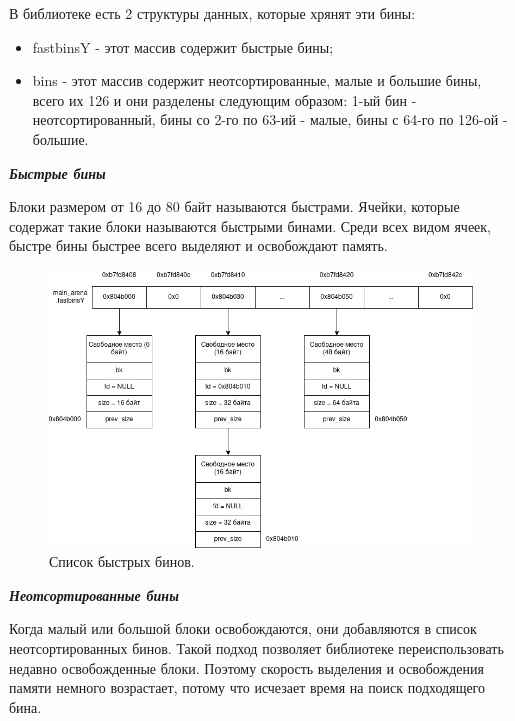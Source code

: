 В библиотеке есть 2 структуры данных, которые хрянят эти бины:
\begin{itemize}
	\item fastbinsY - этот массив содержит быстрые бины;
	\item bins - этот массив содержит неотсортированные, малые и большие бины, всего их 126 и они разделены следующим образом: 1-ый бин - неотсортированный, бины со 2-го по 63-ий - малые, бины с 64-го по 126-ой - большие.
\end{itemize}

\bigbreak
\textit{\textbf{Быстрые бины}}

Блоки размером от 16 до 80 байт называются быстрами. Ячейки, которые содержат такие блоки называются быстрыми бинами. Среди всех видом ячеек, быстре бины быстрее всего выделяют и освобождают память.

\begin{figure}[!h]
	\begin{center}
		\includegraphics[scale=0.6]{images/glibc-malloc-fast-bin-snap.png}
		\caption{Список быстрых бинов.}
		\label{glibc-malloc-fast-bin-snap}
	\end{center}
\end{figure}

\bigbreak
\textit{\textbf{Неотсортированные бины}}

Когда малый или большой блоки освобождаются, они добавляются в список неотсортированных бинов. Такой подход позволяет библиотеке переиспользовать недавно освобожденные блоки. Поэтому скорость выделения и освобождения памяти немного возрастает, потому что исчезает время на поиск подходящего бина.

